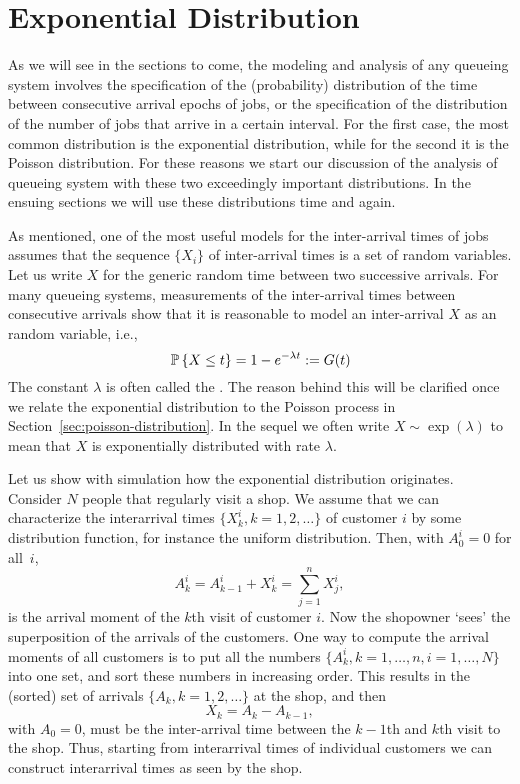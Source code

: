 \section{Exponential Distribution}
\label{sec:expon-distr}
As we will see in the sections to come, the modeling and analysis of
any queueing system involves the specification of the (probability)
distribution of the time between consecutive arrival epochs of jobs,
or the specification of the distribution of the number of jobs that
arrive in a certain interval.  For the first case, the most common
distribution is the exponential distribution, while for the second it
is the Poisson distribution.  For these reasons we start our
discussion of the analysis of queueing system with these two
exceedingly important distributions. In the ensuing sections we will
use these distributions time and again.

As mentioned, one of the most useful models for the inter-arrival
times of jobs assumes that the sequence $\{X_i\}$ of inter-arrival
times is a set of   random variables.  Let us write $X$ for the generic
random time between two successive arrivals. For many queueing
systems, measurements of the inter-arrival times between consecutive
arrivals show that it is reasonable to model an inter-arrival $X$ as
an  random variable, i.e.,
\begin{equation*}
  \P{X \leq t} = 1- e^{-\lambda t} := G(t)
\end{equation*}
The constant $\lambda$ is often called the . The reason
behind this will be clarified once we relate the exponential
distribution to the Poisson process in
Section~\ref{sec:poisson-distribution}.  In the sequel we often write
$X\sim \exp(\lambda)$ to mean that $X$ is exponentially distributed
with rate $\lambda$.


Let us show with simulation how the exponential distribution
originates. Consider $N$ people that regularly visit a shop. We assume
that we can characterize the interarrival times
$\{X_k^i, k=1,2, \ldots\}$ of customer $i$ by some distribution
function, for instance the uniform distribution. Then, with
$A_{0}^i=0$ for all~$i$,
\begin{equation*}
A_k^i = A_{k-1}^i + X_k^i = \sum_{j=1}^n X_j^i,
\end{equation*}
is the arrival moment of the $k$th visit of customer $i$.  Now the
shopowner `sees' the superposition of the arrivals of the
customers. One way to compute the arrival moments of all customers is
to put all the numbers $\{A_k^i, k=1,\ldots,n, i=1,\ldots,N\}$ into
one set, and sort these numbers in increasing order. This results in
the (sorted) set of arrivals $\{A_k, k=1,2,\ldots\}$ at the shop, and
then
\begin{equation*}
X_k = A_k - A_{k-1},
\end{equation*}
with $A_0=0$, must be the inter-arrival time between the $k-1$th and
$k$th visit to the shop.  Thus, starting from interarrival times of
individual customers we can construct interarrival times as seen by
the shop.

